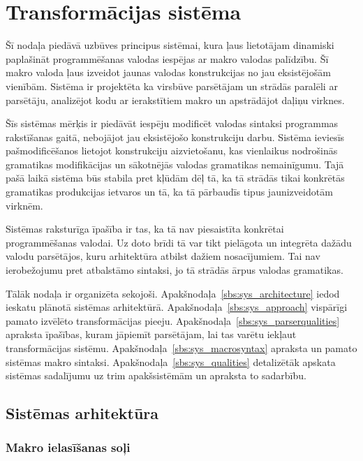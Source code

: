 \section{\label{s:system}Transformācijas sistēma}

Šī nodaļa piedāvā uzbūves principus sistēmai, kura ļaus lietotājam dinamiski paplašināt programmēšanas valodas iespējas ar makro valodas palīdzību. Šī makro valoda ļaus izveidot jaunas valodas konstrukcijas no jau eksistējošām vienībām. Sistēma ir projektēta ka virsbūve parsētājam un strādās paralēli ar parsētāju, analizējot kodu ar ierakstītiem makro un apstrādājot daļiņu virknes.

Šīs sistēmas mērķis ir piedāvāt iespēju modificēt valodas sintaksi programmas rakstīšanas gaitā, nebojājot jau eksistējošo konstrukciju darbu. Sistēma ieviesīs pašmodificēšanos lietojot konstrukciju aizvietošanu, kas vienlaikus nodrošinās gramatikas modifikācijas un sākotnējās valodas gramatikas nemainīgumu. Tajā pašā laikā sistēma būs stabila pret kļūdām dēļ tā, ka tā strādās tikai konkrētās gramatikas produkcijas ietvaros un tā, ka tā pārbaudīs tipus jaunizveidotām virknēm.

Sistēmas raksturīga īpašība ir tas, ka tā nav piesaistīta konkrētai programmēšanas valodai. Uz doto brīdi tā var tikt pielāgota un integrēta dažādu valodu parsētājos, kuru arhitektūra atbilst dažiem nosacījumiem. Tai nav ierobežojumu pret atbalstāmo sintaksi, jo tā strādās ārpus valodas gramatikas.

Tālāk nodaļa ir organizēta sekojoši. Apakšnodaļa~\ref{sbs:sys_architecture} iedod ieskatu plānotā sistēmas arhitektūrā. Apakšnodaļa~\ref{sbs:sys_approach} vispārīgi pamato izvēlēto transformācijas pieeju. Apakšnodaļa~\ref{sbs:sys_parserqualities} apraksta īpašības, kuram jāpiemīt parsētājam, lai tas varētu iekļaut transformācijas sistēmu. Apakšnodaļa~\ref{sbs:sys_macrosyntax} apraksta un pamato sistēmas makro sintaksi. Apakšnodaļa~\ref{sbs:sys_qualities} detalizētāk apskata sistēmas sadalījumu uz trim apakšsistēmām un apraksta to sadarbību.

\subsection{\label{sbs:sys_architecture}Sistēmas arhitektūra}

\subsubsection{Makro ielasīšanas soļi}

